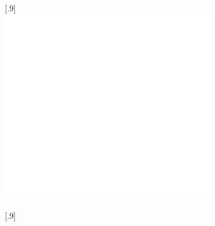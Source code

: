 \begin{figure}\centering%
    \begin{subfigure}{0.5\linewidth}\centering
        \scalebox{1}[.9]{
        \includegraphics[height=\myMinHeight]{img/svg/new_overconstrained_optimal}
        }
        \caption{}\label{fig:overconstrained:optimal}
    \end{subfigure}%
    \hfill
    \begin{subfigure}{0.5\linewidth}\centering
        \scalebox{1}[.9]{
}
\end{subfigure}
\end{figure}
